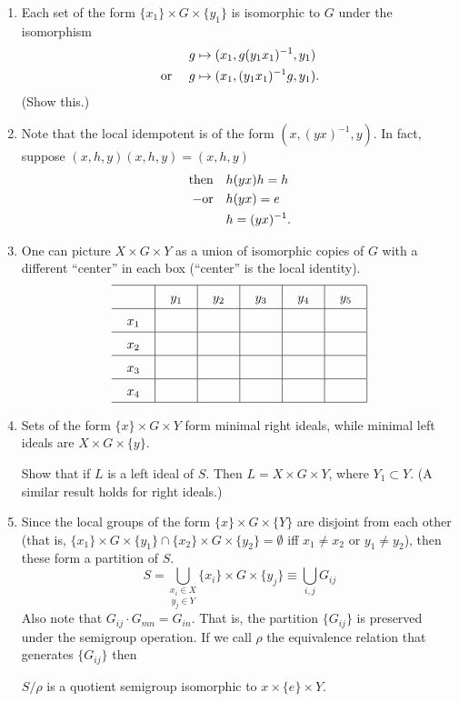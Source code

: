 \begin{enumerate}
\item[(1)] Each set of the form $\{ x_1\} \times G \times \{ y_1\}$ is
isomorphic to $G$ under the isomorphism
\[
     \aligned
     g &\mapsto (x_1,g(y_1x_1)^{-1}, y_1)               \\
     \hbox{or } \quad g &\mapsto
          (x_1,(y_1x_1)^{-1}g, y_1).
     \endaligned
\]
(Show this.)

\item[(2)] Note that the local idempotent is of the form
$(x,(yx)^{-1},y)$.  In fact, suppose $(x,h,y)(x,h,y) = (x,h,y)$
\[
     \alignedat{2}
     \hbox{then}& &\quad &h(yx)h = h                    \\
-     \hbox{or}& &\quad &h(yx) = e                       \\
     & &\quad &h = (yx)^{-1}.
     \endalignedat
\]

\item[(3)] One can picture $X \times G \times Y$ as a union of isomorphic
copies of $G$ with a different ``center'' in each box (``center'' is
the local identity).
\[
\setlength{\tabcolsep}{12pt}
\renewcommand{\arraystretch}{1.5}
\begin{tabular}{c|c|c|c|c|c|} \hline
	&$y_1$  &$y_2$  &$y_3$  &$y_4$  &$y_5$ \\ \hline
$x_1$   & & & & & \\ \hline
$x_2$   & & & & & \\ \hline
$x_3$   & & & & & \\ \hline
$x_4$   & & & & & \\ \hline
\end{tabular}
\]



\item[(4)] Sets of the form $\{ x\} \times G \times Y$ form minimal right ideals, while minimal left ideals are $X \times G \times \{ y\}$.

Show that if $L$ is a left ideal of $S$.  
Then $L = X \times G \times Y$, where $Y_1 \subset Y$.  
(A similar result holds for right ideals.)

\item[(5)] Since the local groups of the form $\{ x\} \times G \times \{ Y\}$
are disjoint from each other (that is, $\{ x_1\} \times G \times \{ y_1\} \cap
\{ x_2\} \times G \times \{ y_2\} = \emptyset$ iff $x_1 \not= x_2$ or
$y_1 \not= y_2$), then these form a partition of $S$.
\[
     S = \underset{y_j \in Y}{\bigcup_{x_i \in X}}
          \{ x_i\} \times G \times \{ y_j\} \equiv \bigcup_{i,j} G_{ij}
\]
Also note that $G_{ij} \cdot G_{mn} = G_{in}$.  
That is, the partition $\{ G_{ij}\}$ is preserved under the semigroup operation.  
If we call $\rho$ the equivalence relation that generates $\{ G_{ij}\}$ then

$S/\rho$ is a quotient semigroup isomorphic to $x \times \{ e\} \times Y$.

\end{enumerate}

